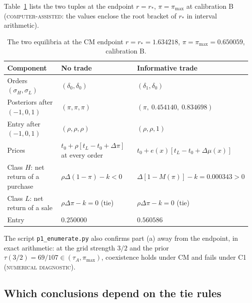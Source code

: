 \documentclass[11pt]{article}
\theoremstyle{definition}
\newcommand{\lab}[1]{\textsc{#1}}
\begin{document}
Table~\ref{tab:cmend} lists the two tuples at the endpoint $r=r_*$, $\pi=\pi_{\max}$ at calibration B
(\lab{computer-assisted}: the values enclose the root bracket of $r_*$ in interval arithmetic).

\begin{table}[h]
\centering
\caption{The two equilibria at the CM endpoint $r=r_*=1.634218$, $\pi=\pi_{\max}=0.650059$, calibration B.}
\label{tab:cmend}
\small
\begin{tabular}{@{}lll@{}}
\toprule
Component & No trade & Informative trade\\
\midrule
Orders $(\sigma_H,\sigma_L)$ & $(\delta_0,\delta_0)$ & $(\delta_1,\delta_0)$\\
Posteriors after $(-1,0,1)$ & $(\pi,\pi,\pi)$ & $(\pi,\ 0.454140,\ 0.834698)$\\
Entry after $(-1,0,1)$ & $(\rho,\rho,\rho)$ & $(\rho,\rho,1)$\\
Prices & $t_0+\rho[t_L-t_0+\Delta\pi]$ at every order & $t_0+e(x)[t_L-t_0+\Delta\mu(x)]$\\
Class $H$: net return of a purchase & $\rho\Delta(1-\pi)-k<0$ & $\Delta[1-M(\pi)]-k=0.000343>0$\\
Class $L$: net return of a sale & $\rho\Delta\pi-k=0$ (tie) & $\rho\Delta\pi-k=0$ (tie)\\
Entry & $0.250000$ & $0.560586$\\
\bottomrule
\end{tabular}
\end{table}

The script \texttt{p1\_enumerate.py} also confirms part (a) away from the endpoint, in exact arithmetic: at the
grid strength $3/2$ and the prior $\tau(3/2)=69/107\in(\tau_A,\pi_{\max})$, coexistence holds under CM and fails
under C1 (\lab{numerical diagnostic}).

\subsection{Which conclusions depend on the tie rules}
\end{document}
